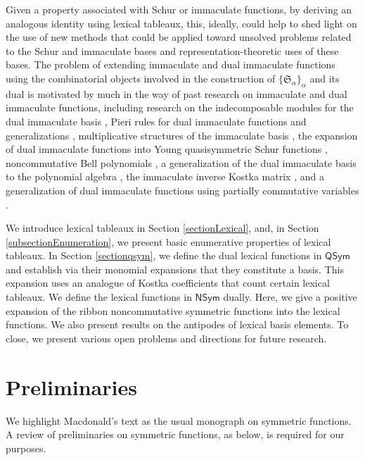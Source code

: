 \documentclass{amsart}
\theoremstyle{definition}
\begin{document}
 Given a property associated with Schur or immaculate functions, by deriving an analogous identity using lexical tableaux, this, ideally, 
 could help to shed light on the use of new methods that could be applied toward unsolved problems related to the Schur and immaculate 
 bases and representation-theoretic uses of these bases. The problem of extending immaculate and dual immaculate functions using 
 the combinatorial objects involved in the construction of $\{ \mathfrak{S}_{\alpha} \}_{\alpha}$ and its dual is motivated by much in the way 
 of past research on immaculate and dual immaculate functions, including research on the indecomposable modules for the dual 
 immaculate basis \cite{BergBergeronSaliolaSerranoZabrocki2015}, Pieri rules for dual immaculate functions and generalizations 
 \cite{BergeronSanchezOrtegaZabrocki2016,Li2018,NieseSundaramvanWilligenburgWang2024}, multiplicative structures of the immaculate 
 basis \cite{BergBergeronSaliolaSerranoZabrocki2017,Li2018}, the expansion of dual immaculate functions into {Y}oung quasisymmetric 
 {S}chur functions \cite{AllenHallamMason2018}, noncommutative {Bell} polynomials \cite{NovelliThibonToumazet2018}, 
 a generalization of the dual immaculate basis to the polynomial algebra \cite{MasonSearles2021}, the immaculate inverse {K}ostka 
 matrix \cite{LoehrNiese2021}, and a generalization of dual immaculate functions using partially commutative 
 variables \cite{Daugherty2024}.
 
  We introduce  lexical tableaux in
  Section \ref{sectionLexical}, and, in Section \ref{subsectionEnumeration}, we present basic enumerative properties of lexical tableaux.   In Section \ref{sectionqsym}, we define the dual lexical functions in $\textsf{QSym}$ and establish via their monomial expansions that they constitute a basis. This expansion uses an analogue of Kostka coefficients that count certain lexical tableaux. We define the lexical functions in $\textsf{NSym}$ dually. Here, we give a positive expansion of the ribbon noncommutative symmetric functions into the lexical functions. We also present results on the antipodes of lexical basis elements. To close, we present various open problems and directions for future research. 

\section{Preliminaries}\label{sectionPreliminaries}
 We highlight Macdonald's text \cite{Macdonald1995} as the usual monograph on symmetric functions. A review of preliminaries on 
 symmetric functions, as below, is required for our purposes. 
\end{document}
